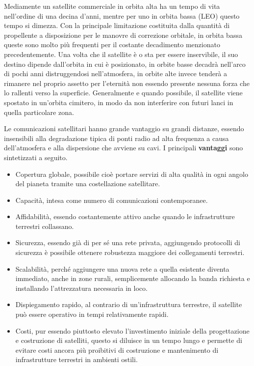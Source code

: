 \documentclass[12pt,a4paper,oneside]{book}
\begin{document}
			Mediamente un satellite commerciale in orbita alta ha un tempo di vita nell'ordine di una decina d'anni, mentre per uno in orbita bassa (LEO) questo tempo si dimezza. Con la principale limitazione costituita dalla quantità di propellente a disposizione per le manovre di correzione orbitale, in orbita bassa queste sono molto più frequenti per il costante decadimento menzionato precedentemente. Una volta che il satellite è o sta per essere inservibile, il suo destino dipende dall'orbita in cui è posizionato, in orbite basse decadrà nell'arco di pochi anni distruggendosi nell'atmosfera, in orbite alte invece tenderà a rimanere nel proprio assetto per l'eternità non essendo presente nessuna forza che lo rallenti verso la superficie. Generalmente e quando possibile, il satellite viene spostato in un'orbita cimitero, in modo da non interferire con futuri lanci in quella particolare zona. 
			
			
			Le comunicazioni satellitari hanno grande vantaggio su grandi distanze, essendo insensibili alla degradazione tipica di ponti radio ad alta frequenza a causa dell'atmosfera e alla dispersione che avviene su cavi.
			I principali {\bf vantaggi} sono sintetizzati a seguito. 
			\begin{itemize}
				\item Copertura globale, possibile cioè portare servizi di alta qualità in ogni angolo del pianeta tramite una costellazione satellitare. 
				\item Capacità, intesa come numero di comunicazioni contemporanee.
				\item Affidabilità, essendo costantemente attivo anche quando le infrastrutture terrestri collassano.
				\item Sicurezza, essendo già di per sé una rete privata, aggiungendo protocolli di sicurezza è possibile ottenere robustezza maggiore dei collegamenti terrestri.
				\item Scalabilità, perché aggiungere una nuova rete a quella esistente diventa immediato, anche in zone rurali, semplicemente allocando la banda richiesta e installando l'attrezzatura necessaria in loco.
				\item Dispiegamento rapido, al contrario di un'infrastruttura terrestre, il satellite può essere operativo in tempi relativamente rapidi.				
				\item Costi, pur essendo piuttosto elevato l'investimento iniziale della progettazione e costruzione di satelliti, questo si diluisce in un tempo lungo e permette di evitare costi ancora più proibitivi di costruzione e mantenimento di infrastrutture terrestri in ambienti ostili.				
			\end{itemize} 
		
\end{document}
